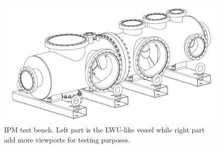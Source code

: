 \begin{figure}[!ht]
	\begin{center}
		\includegraphics[width=\textwidth]{04_IPHI_Test/figures/fig000_Testbench.png}
	\end{center}
	\caption[IPM test bench]{IPM test bench. Left part is the LWU-like vessel
	while right part add more viewports for testing purposes.}
	\label{chap4:Testbench}
\end{figure}
